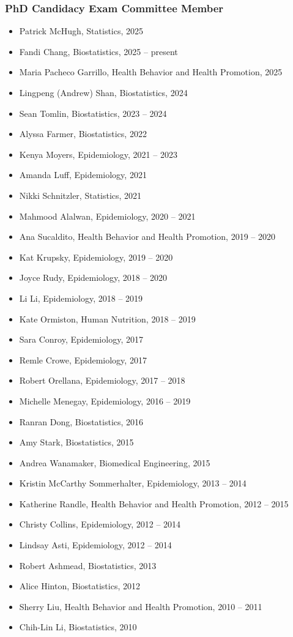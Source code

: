 \documentclass[
  english,
  letterpaper,
  DIV=11,
  numbers=noendperiod]{scrartcl}
\providecommand{\tightlist}{%
  \setlength{\itemsep}{0pt}\setlength{\parskip}{0pt}}
\begin{document}
\subsubsection{PhD Candidacy Exam Committee
Member}\label{phd-candidacy-exam-committee-member}

\begin{itemize}
\tightlist
\item
  Patrick McHugh, Statistics, 2025
\item
  Fandi Chang, Biostatistics, 2025 -- present
\item
  Maria Pacheco Garrillo, Health Behavior and Health Promotion, 2025
\item
  Lingpeng (Andrew) Shan, Biostatistics, 2024
\item
  Sean Tomlin, Biostatistics, 2023 -- 2024
\item
  Alyssa Farmer, Biostatistics, 2022
\item
  Kenya Moyers, Epidemiology, 2021 -- 2023
\item
  Amanda Luff, Epidemiology, 2021
\item
  Nikki Schnitzler, Statistics, 2021
\item
  Mahmood Alalwan, Epidemiology, 2020 -- 2021
\item
  Ana Sucaldito, Health Behavior and Health Promotion, 2019 -- 2020
\item
  Kat Krupsky, Epidemiology, 2019 -- 2020
\item
  Joyce Rudy, Epidemiology, 2018 -- 2020
\item
  Li Li, Epidemiology, 2018 -- 2019
\item
  Kate Ormiston, Human Nutrition, 2018 -- 2019
\item
  Sara Conroy, Epidemiology, 2017
\item
  Remle Crowe, Epidemiology, 2017
\item
  Robert Orellana, Epidemiology, 2017 -- 2018
\item
  Michelle Menegay, Epidemiology, 2016 -- 2019
\item
  Ranran Dong, Biostatistics, 2016
\item
  Amy Stark, Biostatistics, 2015
\item
  Andrea Wanamaker, Biomedical Engineering, 2015
\item
  Kristin McCarthy Sommerhalter, Epidemiology, 2013 -- 2014
\item
  Katherine Randle, Health Behavior and Health Promotion, 2012 -- 2015
\item
  Christy Collins, Epidemiology, 2012 -- 2014
\item
  Lindsay Asti, Epidemiology, 2012 -- 2014
\item
  Robert Ashmead, Biostatistics, 2013
\item
  Alice Hinton, Biostatistics, 2012
\item
  Sherry Liu, Health Behavior and Health Promotion, 2010 -- 2011
\item
  Chih-Lin Li, Biostatistics, 2010
\end{itemize}
\end{document}
